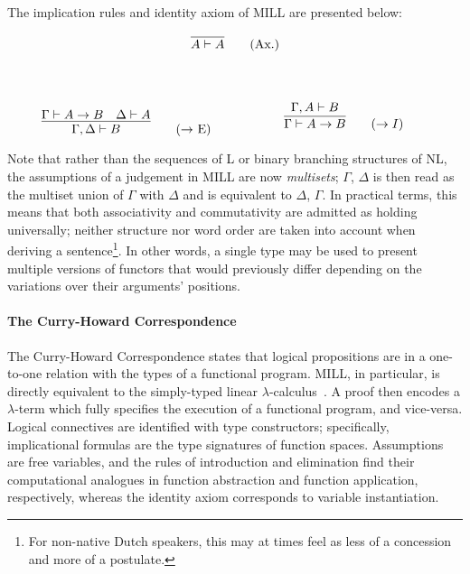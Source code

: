 The implication rules and identity axiom of MILL are presented below:

\begin{center}
\begin{minipage}{0.5\textwidth}
\[
\infer{A \vdash A}{}\tag{Ax.}
\]
\end{minipage}\\
\end{center}
\begin{align*}
    \begin{minipage}{0.5\textwidth}
	\[
        \infer{\Gamma, \Delta \vdash B}{
            \Gamma \vdash A \rightarrow B
            &
            \Delta \vdash A
        }\tag{$\rightarrow$ E}
    \]
    \end{minipage}
    \begin{minipage}{0.5\textwidth}
    \[
        \infer{\Gamma \vdash A \rightarrow B}{
            \Gamma, A \vdash B
        }\tag{$\rightarrow I$}\\
    \]
    \end{minipage}
\end{align*}

Note that rather than the sequences of L or binary branching structures of NL, the assumptions of a judgement in MILL are now \textit{multisets}; $\Gamma$, $\Delta$ is then read as the multiset union of $\Gamma$ with $\Delta$ and is equivalent to $\Delta$, $\Gamma$.
In practical terms, this means that both associativity and commutativity are admitted as holding universally; neither structure nor word order are taken into account when deriving a sentence\footnote{For non-native Dutch speakers, this may at times feel as less of a concession and more of a postulate.}.
In other words, a single type may be used to present multiple versions of functors that would previously differ depending on the variations over their arguments' positions.

\paragraph{The Curry-Howard Correspondence}
The Curry-Howard Correspondence states that logical propositions are in a one-to-one relation with the types of a functional program.
MILL, in particular, is directly equivalent to the simply-typed linear $\lambda$-calculus~\cite{benton1993term, abramsky1993computational}.
A proof then encodes a $\lambda$-term which fully specifies the execution of a functional program, and vice-versa.
Logical connectives are identified with type constructors; specifically, implicational formulas are the type signatures of function spaces. 
Assumptions are free variables, and the rules of introduction and elimination find their computational analogues in function abstraction and function application, respectively, whereas the identity axiom corresponds to variable instantiation.

